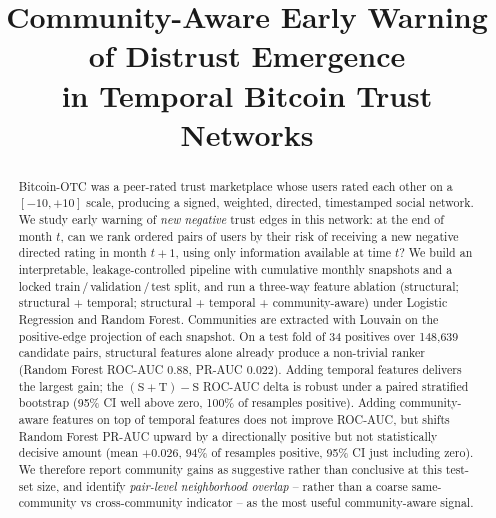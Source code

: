 \documentclass[conference]{IEEEtran}
\newcommand{\todo}[1]{\textcolor{red}{\textbf{[TODO: #1]}}}
\begin{document}
\title{Community-Aware Early Warning of Distrust Emergence \\
in Temporal Bitcoin Trust Networks}

\author{
}

\maketitle

\begin{abstract}
Bitcoin-OTC was a peer-rated trust marketplace whose users rated each
other on a $[-10, +10]$ scale, producing a signed, weighted, directed,
timestamped social network. We study early warning of \emph{new
negative} trust edges in this network: at the end of month $t$, can we
rank ordered pairs of users by their risk of receiving a new negative
directed rating in month $t+1$, using only information available at
time $t$? We build an interpretable, leakage-controlled pipeline with
cumulative monthly snapshots and a locked train\,/\,validation\,/\,test
split, and run a three-way feature ablation
(structural; structural + temporal;
structural + temporal + community-aware) under Logistic Regression and
Random Forest. Communities are extracted with Louvain on the
positive-edge projection of each snapshot. On a test fold of 34
positives over 148{,}639 candidate pairs, structural features alone
already produce a non-trivial ranker (Random Forest ROC-AUC $0.88$,
PR-AUC $0.022$). Adding temporal features delivers the largest gain;
the $(\mathrm{S}{+}\mathrm{T}) - \mathrm{S}$ ROC-AUC delta is robust
under a paired stratified bootstrap (95\% CI well above zero, 100\% of
resamples positive). Adding community-aware features on top of
temporal features does not improve ROC-AUC, but shifts Random Forest
PR-AUC upward by a directionally positive but not statistically
decisive amount (mean $+0.026$, 94\% of resamples positive, 95\% CI
just including zero). We therefore report community gains as
suggestive rather than conclusive at this test-set size, and identify
\emph{pair-level neighborhood overlap} -- rather than a coarse
same-community vs cross-community indicator -- as the most useful
community-aware signal.
\end{abstract}
\end{document}
